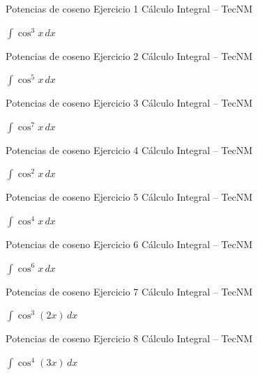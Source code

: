 \documentclass[aspectratio=169,12pt]{beamer}
\newcommand{\ejercicio}[1]{%
  \begin{center}
  \vfill
  {\fontsize{24}{30}\selectfont #1}
  \vfill
  \end{center}
}
\begin{document}
\begin{frame}{Potencias de coseno}
\small Ejercicio 1 \hfill Cálculo Integral -- TecNM
\ejercicio{$\displaystyle \int \cos^3 x\,dx$}
\end{frame}
\begin{frame}{Potencias de coseno}
\small Ejercicio 2 \hfill Cálculo Integral -- TecNM
\ejercicio{$\displaystyle \int \cos^5 x\,dx$}
\end{frame}
\begin{frame}{Potencias de coseno}
\small Ejercicio 3 \hfill Cálculo Integral -- TecNM
\ejercicio{$\displaystyle \int \cos^7 x\,dx$}
\end{frame}
\begin{frame}{Potencias de coseno}
\small Ejercicio 4 \hfill Cálculo Integral -- TecNM
\ejercicio{$\displaystyle \int \cos^2 x\,dx$}
\end{frame}
\begin{frame}{Potencias de coseno}
\small Ejercicio 5 \hfill Cálculo Integral -- TecNM
\ejercicio{$\displaystyle \int \cos^4 x\,dx$}
\end{frame}
\begin{frame}{Potencias de coseno}
\small Ejercicio 6 \hfill Cálculo Integral -- TecNM
\ejercicio{$\displaystyle \int \cos^6 x\,dx$}
\end{frame}
\begin{frame}{Potencias de coseno}
\small Ejercicio 7 \hfill Cálculo Integral -- TecNM
\ejercicio{$\displaystyle \int \cos^3(2x)\,dx$}
\end{frame}
\begin{frame}{Potencias de coseno}
\small Ejercicio 8 \hfill Cálculo Integral -- TecNM
\ejercicio{$\displaystyle \int \cos^4(3x)\,dx$}
\end{frame}
\end{document}
